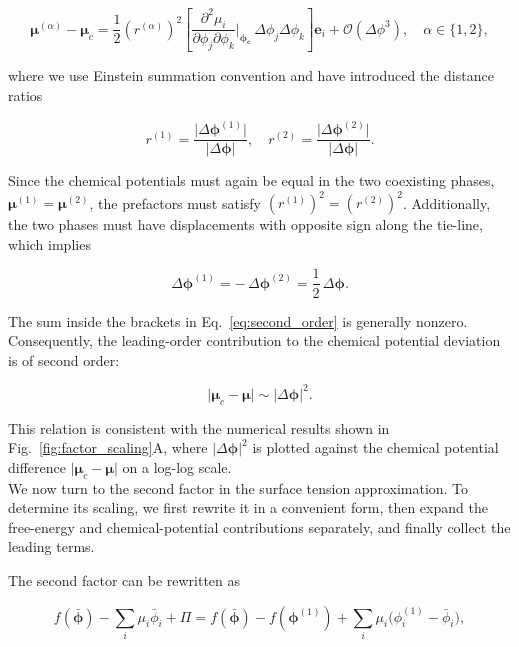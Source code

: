 \documentclass[12pt]{article}
\begin{document}
\begin{equation}
 \boldsymbol{\mu}^{(\alpha)} - \boldsymbol{\mu}_c
    =
    \frac{1}{2}
    \left(r^{(\alpha)}\right)^2
    \left[
        \frac{\partial^2 \mu_i}{\partial \phi_j \partial \phi_k}\bigg\rvert_{\boldsymbol{\phi_c}}
        \,\Delta \phi_j \Delta \phi_k
    \right]\boldsymbol{e}_i
    + \mathcal{O}(\Delta \phi^3),\quad \alpha \in \{1,2\},
    \label{eq:second_order}
\end{equation}

where we use Einstein summation convention and have
introduced the distance ratios

\[
    r^{(1)}
    =
    \frac{\lvert \Delta \boldsymbol{\phi}^{(1)} \rvert}
         {\lvert \Delta \boldsymbol{\phi} \rvert}, \quad r^{(2)}
    =
    \frac{\lvert \Delta \boldsymbol{\phi}^{(2)} \rvert}
         {\lvert \Delta \boldsymbol{\phi} \rvert}.
\]

Since the chemical potentials must again be equal in the two coexisting phases,
$\boldsymbol{\mu}^{(1)}=\boldsymbol{\mu}^{(2)}$, the prefactors must satisfy
$\left(r^{(1)}\right)^2=\left(r^{(2)}\right)^2$. Additionally, the two phases
must have displacements with opposite sign along the tie-line, which implies

\[
    \Delta \boldsymbol{\phi}^{(1)}
    =
    -\,\Delta \boldsymbol{\phi}^{(2)}
    =
    \frac{1}{2}\,\Delta \boldsymbol{\phi}.
\]

The sum inside the brackets in Eq.~\eqref{eq:second_order} is generally nonzero.
Consequently, the leading-order contribution to the chemical potential deviation is of second order:

\[
    \lvert \boldsymbol{\mu}_c-\boldsymbol{\mu} \rvert
    \sim
    \lvert \Delta \boldsymbol{\phi} \rvert^2.
\]

This relation is consistent with the numerical results shown in Fig.~\ref{fig:factor_scaling}A, where $\lvert \Delta \boldsymbol{\phi} \rvert^2$ is plotted against the chemical potential difference $\lvert \boldsymbol{\mu}_c-\boldsymbol{\mu} \rvert$ on a log-log scale.\\

We now turn to the second factor in the surface tension approximation. To determine its scaling, we first rewrite it in a convenient form, then expand the free-energy and chemical-potential contributions separately, and finally collect the leading terms.

The second factor can be rewritten as

\begin{equation}
    f(\bar{\boldsymbol{\phi}})
    -\sum_i \mu_i \bar{\phi}_i
    + \Pi
    =
    f(\bar{\boldsymbol{\phi}})
    - f(\boldsymbol{\phi}^{(1)})
    +\sum_i \mu_i \bigl(\phi_i^{(1)} - \bar{\phi}_i\bigr),
    \label{eq:second_product}
\end{equation}
\end{document}
